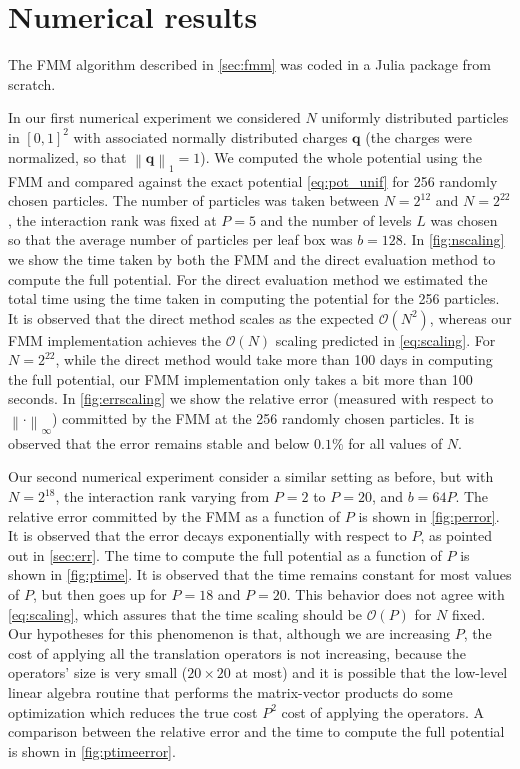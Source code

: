 \documentclass[final,onefignum,onetabnum]{siamart220329}
\newcommand{\bol}{\boldsymbol}
\newcommand{\Ocal}{\mathcal{O}}
\newcommand{\norm}[1]{\left\|#1\right\|}
\begin{document}
\section{Numerical results}
The FMM algorithm described in \cref{sec:fmm} was coded in a Julia package \cite{fmmproject} from scratch.

In our first numerical experiment we considered $N$ uniformly distributed particles in $[0,1]^2$ with associated normally distributed charges $\bol q$ (the charges were normalized, so that $\norm{\bol q}_1 = 1$). We computed the whole potential using the FMM and compared against the exact potential \cref{eq:pot_unif} for 256 randomly chosen particles. The number of particles was taken between $N=2^{12}$ and $N=2^{22}$, the interaction rank was fixed at $P=5$ and the number of levels $L$ was chosen so that the average number of particles per leaf box was $b=128$. In \cref{fig:nscaling} we show the time taken by both the FMM and the direct evaluation method to compute the full potential. For the direct evaluation method we estimated the total time using the time taken in computing the potential for the 256 particles. It is observed that the direct method scales as the expected $\Ocal(N^2)$, whereas our FMM implementation achieves the $\Ocal(N)$ scaling predicted in \cref{eq:scaling}. For $N=2^{22}$, while the direct method would take more than 100 days in computing the full potential, our FMM implementation only takes a bit more than 100 seconds. In \cref{fig:errscaling} we show the relative error (measured with respect to $\norm{\cdot}_\infty$) committed by the FMM at the 256 randomly chosen particles. It is observed that the error remains stable and below $0.1\%$ for all values of $N$.

Our second numerical experiment consider a similar setting as before, but with $N=2^{18}$, the interaction rank varying from $P=2$ to $P=20$, and $b = 64P$. The relative error committed by the FMM as a function of $P$ is shown in \cref{fig:perror}. It is observed that the error decays exponentially with respect to $P$, as pointed out in \cref{sec:err}. The time to compute the full potential as a function of $P$ is shown in \cref{fig:ptime}. It is observed that the time remains constant for most values of $P$, but then goes up for $P=18$ and $P=20$. This behavior does not agree with \cref{eq:scaling}, which assures that the time scaling should be $\Ocal(P)$ for $N$ fixed. Our hypotheses for this phenomenon is that, although we are increasing $P$, the cost of applying all the translation operators is not increasing, because the operators' size is very small ($20\times 20$ at most) and it is possible that the low-level linear algebra routine that performs the matrix-vector products do some optimization which reduces the true cost $P^2$ cost of applying the operators. A comparison between the relative error and the time to compute the full potential is shown in \cref{fig:ptimeerror}.
\end{document}
